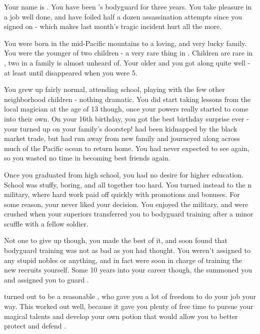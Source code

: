 \documentclass[char]{NeptuneBall}
\begin{document}
\name{\cBodyguard{}}

Your name is \cBodyguard{}. You have been \cPrince{}'s bodyguard for three years. You take pleasure in a job well done, and have foiled half a dozen assassination attempts since you signed on - which makes last month's tragic incident hurt all the more.

You were born in the mid-Pacific mountains to a loving, and very lucky family. You were the younger of two children - a very rare thing in \pPacifica{}. Children are rare in \pPacifica{}, two in a family is almost unheard of. Your older \cSpy{\sibling} \cSpy{} and you got along quite well - at least until \cSpy{\they} disappeared when you were 5.

You grew up fairly normal, attending school, playing with the few other neighborhood children - nothing dramatic. You did start taking lessons from the local magician at the age of 13 though, once your powers really started to come into their own. On your 16th birthday, you got the best birthday surprise ever - your \cSpy{\sibling} turned up on your family's doorstep! \cSpy{\They} had been kidnapped by the black market trade, but had run away from \cSpy{\their} new family and journeyed along across much of the Pacific ocean to return home. You had never expected to see \cSpy{\them} again, so you wasted no time in becoming best friends again.

Once you graduated from high school, you had no desire for higher education. School was stuffy, boring, and all together too hard. You turned instead to the \pPacifica{}n military, where hard work paid off quickly with promotions and bonuses. For some reason, your \cSpy{\sibling} never liked your decision. You enjoyed the military, and were crushed when your superiors transferred you to bodyguard training after a minor scuffle with a fellow soldier.

Not one to give up though, you made the best of it, and soon found that bodyguard training was not as bad as you had thought. You weren't assigned to any stupid nobles or anything, and in fact were soon in charge of training the new recruits yourself. Some 10 years into your career though, the \cPacificanRuler{\King} \cPacificanRuler{\themself} summoned you and assigned you to guard \cPacificanRuler{\their} \cPrince{\offspring} \cPrince{}.

\cPrince{} turned out to be a reasonable \cPrince{\guy}, who gave you a lot of freedom to do your job your way. This worked out well, because it gave you plenty of free time to pursue your magical talents and develop your own potion that would allow you to better protect and defend \cPrince{\them}.
\end{document}
